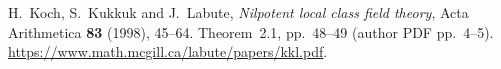 H.~Koch, S.~Kukkuk and J.~Labute, \emph{Nilpotent local class field theory},
Acta Arithmetica \textbf{83} (1998), 45--64.
Theorem~2.1, pp.~48--49 (author PDF pp.~4--5).
\url{https://www.math.mcgill.ca/labute/papers/kkl.pdf}.
